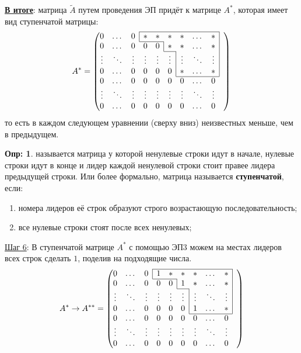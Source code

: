 \documentclass[12pt]{article}
\theoremstyle{definition}
\newtheorem{defn}{Опр:}
\newcommand{\wte}[1]{\widetilde{#1}}
\begin{document}
\uline{\textbf{В итоге}}: матрица $\wte{A}$ путем проведения ЭП придёт к матрице $A^{*}$, которая имеет вид ступенчатой матрицы:
$$
	A^{*}  = 
	\begin{pmatrix} \cline{4-9}
		0 & \dotsc & 0 & \multicolumn{1}{|c}{*} & * & * & * & \dotsc & \multicolumn{1}{c|}{*} & \\ \cline{4-5}
		0 & \dotsc & 0 & 0 & 0 & \multicolumn{1}{|c}{*} & * &\dotsc & \multicolumn{1}{c|}{*} & \\  \cline{6-6}
		\vdots & \ddots & \vdots & \vdots & \vdots & \vdots & \multicolumn{1}{|c}{\vdots} & \ddots & \multicolumn{1}{c|}{\vdots} & \\ 
		0 & \dotsc & 0 & 0 & 0 & 0 & \multicolumn{1}{|c}{*} & \dotsc & \multicolumn{1}{c|}{*} & \\ \cline{7-9}
		0 & \dotsc & 0 & 0 & 0 & 0 & 0 & \dotsc & 0 &\\  
		\vdots & \ddots & \vdots & \vdots & \vdots & \vdots & \vdots & \ddots & \vdots& \\  
		0 & \dotsc & 0 & 0 & 0 & 0 & 0 & \dotsc & 0 &\\  
	\end{pmatrix}
$$
то есть в каждом следующем уравнении (сверху вниз) неизвестных меньше, чем в предыдущем.
\begin{defn}
	 называется матрица у которой ненулевые строки идут в начале, нулевые строки идут в конце и лидер каждой ненулевой строки стоит правее лидера предыдущей строки. Или более формально, матрица называется \textbf{ступенчатой}, если:
	\begin{enumerate}[label=\arabic*)]
		\item номера лидеров её строк образуют строго возрастающую последовательность;
		\item все нулевые строки стоят после всех ненулевых;
	\end{enumerate}
\end{defn}
\uline{Шаг 6}: В ступенчатой матрице $A^*$ с помощью ЭП$3$ можем на местах лидеров всех строк сделать $1$, поделив на подходящие числа.
$$
	A^{*}  \to A^{**} =  
	\begin{pmatrix} \cline{4-9}
		0 & \dotsc & 0 & \multicolumn{1}{|c}{1} & * & * & * & \dotsc & \multicolumn{1}{c|}{*} & \\ \cline{4-5}
		0 & \dotsc & 0 & 0 & 0 & \multicolumn{1}{|c}{1} & * &\dotsc & \multicolumn{1}{c|}{*} & \\  \cline{6-6}
		\vdots & \ddots & \vdots & \vdots & \vdots & \vdots & \multicolumn{1}{|c}{\vdots} & \ddots & \multicolumn{1}{c|}{\vdots} & \\ 
		0 & \dotsc & 0 & 0 & 0 & 0 & \multicolumn{1}{|c}{1} & \dotsc & \multicolumn{1}{c|}{*} & \\ \cline{7-9}
		0 & \dotsc & 0 & 0 & 0 & 0 & 0 & \dotsc & 0 &\\  
		\vdots & \ddots & \vdots & \vdots & \vdots & \vdots & \vdots & \ddots & \vdots& \\  
		0 & \dotsc & 0 & 0 & 0 & 0 & 0 & \dotsc & 0 &\\  
	\end{pmatrix}
$$
\end{document}
